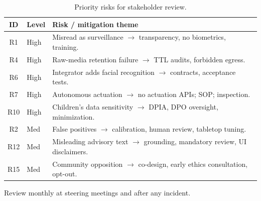 \begin{table}[htbp]
  \centering
  \caption{Priority risks for stakeholder review.}
  \label{tab:top-risks}
  \small
  \begin{tabular}{@{}clp{6.8cm}@{}}
    \toprule
    ID & Level & Risk / mitigation theme \\
    \midrule
    R1 & High &
      Misread as surveillance $\rightarrow$ transparency, no biometrics, training. \\
    R4 & High &
      Raw-media retention failure $\rightarrow$ TTL audits, forbidden egress. \\
    R6 & High &
      Integrator adds facial recognition $\rightarrow$ contracts, acceptance tests. \\
    R7 & High &
      Autonomous actuation $\rightarrow$ no actuation APIs; SOP; inspection. \\
    R10 & High &
      Children's data sensitivity $\rightarrow$ DPIA, DPO oversight, minimization. \\
    R2 & Med &
      False positives $\rightarrow$ calibration, human review, tabletop tuning. \\
    R12 & Med &
      Misleading advisory text $\rightarrow$ grounding, mandatory review, UI disclaimers. \\
    R15 & Med &
      Community opposition $\rightarrow$ co-design, early ethics consultation, opt-out. \\
    \bottomrule
  \end{tabular}
\end{table}

Review monthly at steering meetings and after any incident.
